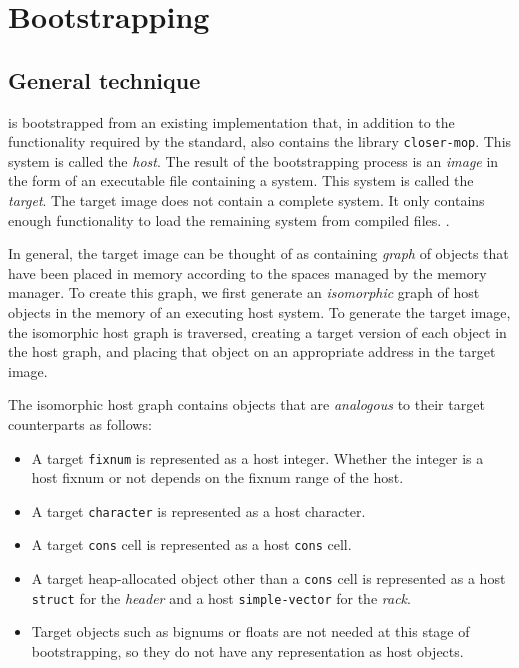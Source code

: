 \chapter{Bootstrapping}

\section{General technique}

\sysname{} is bootstrapped from an existing \commonlisp{}
implementation that, in addition to the functionality required by the
standard, also contains the library \texttt{closer-mop}.  This
\commonlisp{} system is called the \emph{host}.  The result of the
bootstrapping process is an \emph{image} in the form of an executable
file containing a \sysname{} system.  This system is called the
\emph{target}.  The target image does not contain a complete
\commonlisp{} system.  It only contains enough functionality to load
the remaining system from compiled files.
.

In general, the target image can be thought of as containing
\emph{graph} of \commonlisp{} objects that have been placed in memory
according to the spaces managed by the memory manager.  To create this
graph, we first generate an \emph{isomorphic} graph of host objects in
the memory of an executing host system.  To generate the target image,
the isomorphic host graph is traversed, creating a target version of
each object in the host graph, and placing that object on an
appropriate address in the target image.

The isomorphic host graph contains objects that are \emph{analogous}
to their target counterparts as follows:

\begin{itemize}
\item A target \texttt{fixnum} is represented as a host integer.
  Whether the integer is a host fixnum or not depends on the fixnum
  range of the host.
\item A target \texttt{character} is represented as a host character.
\item A target \texttt{cons} cell is represented as a host
  \texttt{cons} cell.
\item A target heap-allocated object other than a \texttt{cons} cell
  is represented as a host \texttt{struct} for the \emph{header} and a
  host \texttt{simple-vector} for the \emph{rack}.
\item Target objects such as bignums or floats are not needed at this
  stage of bootstrapping, so they do not have any representation as
  host objects.
\end{itemize}

